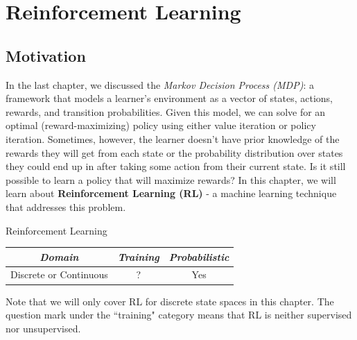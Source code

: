 \chapter{Reinforcement Learning}
\section{Motivation}
In the last chapter, we discussed the \textit{Markov Decision Process (MDP)}: a framework that models a learner's environment as a vector of states, actions, rewards, and transition probabilities. Given this model, we can solve for an optimal (reward-maximizing) policy using either value iteration or policy iteration. Sometimes, however, the learner doesn't have prior knowledge of the rewards they will get from each state or the probability distribution over states they could end up in after taking some action from their current state. Is it still possible to learn a policy that will maximize rewards? In this chapter, we will learn about \textbf{Reinforcement Learning (RL)} - a machine learning technique that addresses this problem.
\begin{mlcube}{Reinforcement Learning}
\begin{center}
    \begin{tabular}{c|c|c}
    \textit{\textbf{Domain}} & \textit{\textbf{Training}} & \textit{\textbf{Probabilistic}} \\
    \hline
    Discrete or Continuous & ? & Yes \\
    \end{tabular}
\end{center}
Note that we will only cover RL for discrete state spaces in this chapter. The question mark under the ``training" category means that RL is neither supervised nor unsupervised. 
\end{mlcube}
